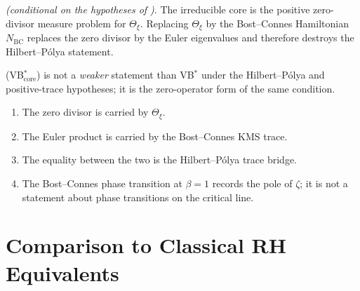 \begin{corollary}
\label{v4-arith:vb:cor:irreducible-core}
\emph{(conditional on the hypotheses of
)}. The irreducible core is the
positive zero-divisor measure problem for \(\Theta_{\xi}\). Replacing
\(\Theta_{\xi}\) by the Bost--Connes Hamiltonian \(N_{\mathrm{BC}}\)
replaces the zero divisor by the Euler eigenvalues and therefore
destroys the Hilbert--P\'olya statement.
\end{corollary}

\begin{remark}
\label{v4-arith:vb:rem:core-meaning}
(VB\(^{*}_{\mathrm{core}}\)) is not a \emph{weaker} statement than
VB\(^{*}\) under the Hilbert--P\'olya and positive-trace hypotheses; it
is the zero-operator form of the same condition.
\begin{enumerate}
\item The zero divisor is carried by \(\Theta_{\xi}\).
\item The Euler product is carried by the Bost--Connes KMS trace.
\item The equality between the two is the Hilbert--P\'olya trace
bridge.
\item The Bost--Connes phase transition at \(\beta=1\) records the
pole of \(\zeta\); it is not a statement about phase transitions on
the critical line.
\end{enumerate}
\end{remark}

\section{Comparison to Classical RH Equivalents}
\label{v4-arith:vb:comparison}

